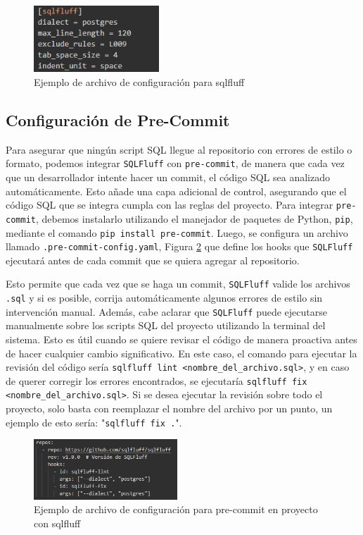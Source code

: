 \documentclass{IEEEtran}
\begin{document}
\begin{figure}[H]
    \centering
    \includegraphics[width=0.42\textwidth]{images/sqlFluffConfigExample.png}
    \caption{Ejemplo de archivo de configuración para sqlfluff}
    \label{fig:sqlFluffConfigExample}
\end{figure}


\subsection{Configuración de Pre-Commit}
Para asegurar que ningún script SQL llegue al repositorio con errores de estilo o formato, podemos integrar \texttt{SQLFluff} con \texttt{pre-commit}, de manera que cada vez que un desarrollador intente hacer un commit, el código SQL sea analizado automáticamente. Esto añade una capa adicional de control, asegurando que el código SQL que se integra cumpla con las reglas del proyecto. Para integrar \texttt{pre-commit}, debemos instalarlo utilizando el manejador de paquetes de Python, \texttt{pip}, mediante el comando \texttt{pip install pre-commit}. Luego, se configura un archivo llamado \texttt{.pre-commit-config.yaml}, Figura \ref{fig:precommitExample} que define los hooks que \texttt{SQLFluff} ejecutará antes de cada commit que se quiera agregar al repositorio.

Esto permite que cada vez que se haga un commit, \texttt{SQLFluff} valide los archivos \texttt{.sql} y si es posible, corrija automáticamente algunos errores de estilo sin intervención manual. Además, cabe aclarar que \texttt{SQLFluff} puede ejecutarse manualmente sobre los scripts SQL del proyecto utilizando la terminal del sistema. Esto es útil cuando se quiere revisar el código de manera proactiva antes de hacer cualquier cambio significativo. En este caso, el comando para ejecutar la revisión del código sería \texttt{sqlfluff lint <nombre\_del\_archivo.sql>}, y en caso de querer corregir los errores encontrados, se ejecutaría \texttt{sqlfluff fix <nombre\_del\_archivo.sql>}. Si se desea ejecutar la revisión sobre todo el proyecto, solo basta con reemplazar el nombre del archivo por un punto, un ejemplo de esto sería: "\texttt{sqlfluff fix .}".

\begin{figure}[H]
    \centering
    \includegraphics[width=0.48\textwidth]{images/precommitExample.png}
    \caption{Ejemplo de archivo de configuración para pre-commit en proyecto con sqlfluff}
    \label{fig:precommitExample}
\end{figure}
\end{document}
